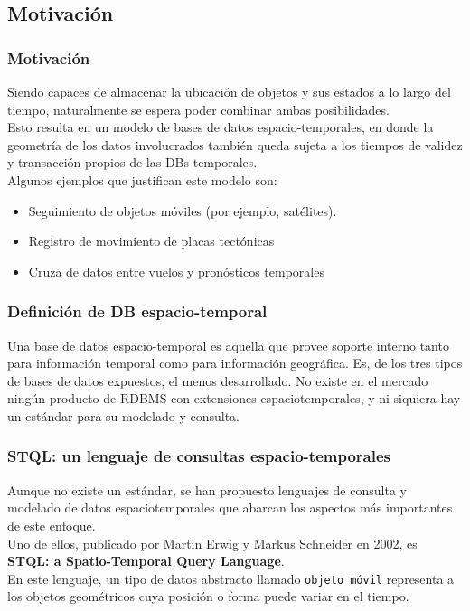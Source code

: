 
\subsection{Motivación}

\begin{frame}
	\frametitle{Motivación}
	Siendo capaces de almacenar la ubicación de objetos y sus estados a lo largo del tiempo, naturalmente se espera poder combinar ambas posibilidades. \pause \\
	Esto resulta en un modelo de bases de datos espacio-temporales, en donde la geometría de los datos involucrados también queda sujeta a los tiempos de validez y transacción propios de las DBs temporales. \pause \\
Algunos ejemplos que justifican este modelo son: \pause
	\begin{itemize}
	\item	Seguimiento de objetos móviles (por ejemplo, satélites). \pause
	\item	Registro de movimiento de placas tectónicas \pause
	\item	Cruza de datos entre vuelos y pronósticos temporales
	\end{itemize}
\end{frame}

\begin{frame}
	\frametitle{Definición de DB espacio-temporal}
	Una base de datos espacio-temporal es aquella que provee soporte interno tanto para información temporal como para información geográfica. \pause
	Es, de los tres tipos de bases de datos expuestos, el menos desarrollado. No existe en el mercado ningún producto de RDBMS con extensiones espaciotemporales, y ni siquiera hay un estándar para su modelado y consulta. \pause
\end{frame}

\begin{frame}
	\frametitle{STQL: un lenguaje de consultas espacio-temporales}
	Aunque no existe un estándar, se han propuesto lenguajes de consulta y modelado de datos espaciotemporales que abarcan los aspectos más importantes de este enfoque. \pause \\
	Uno de ellos, publicado por Martin Erwig y Markus Schneider en 2002, es \textbf{STQL: a Spatio-Temporal Query Language}. \pause \\
	En este lenguaje, un tipo de datos abstracto llamado \texttt{objeto móvil} representa a los objetos geométricos cuya posición o forma puede variar en el tiempo.

\end{frame}
